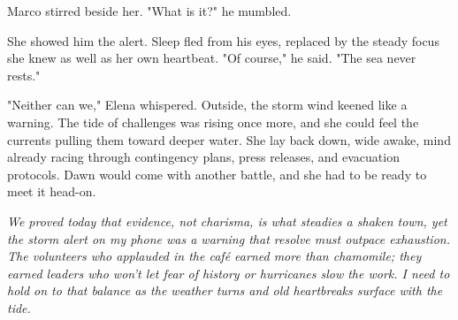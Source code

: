 Marco stirred beside her. "What is it?" he mumbled.

She showed him the alert. Sleep fled from his eyes, replaced by the steady focus she knew as well as her own heartbeat. "Of course," he said. "The sea never rests."

"Neither can we," Elena whispered. Outside, the storm wind keened like a warning. The tide of challenges was rising once more, and she could feel the currents pulling them toward deeper water. She lay back down, wide awake, mind already racing through contingency plans, press releases, and evacuation protocols. Dawn would come with another battle, and she had to be ready to meet it head-on.


\noindent\textit{We proved today that evidence, not charisma, is what steadies a shaken town, yet the storm alert on my phone was a warning that resolve must outpace exhaustion. The volunteers who applauded in the café earned more than chamomile; they earned leaders who won't let fear of history or hurricanes slow the work. I need to hold on to that balance as the weather turns and old heartbreaks surface with the tide.}
